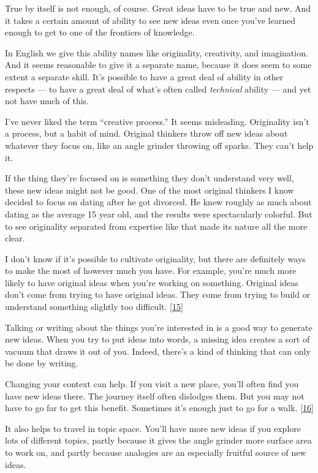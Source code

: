 True by itself is not enough, of course. Great ideas have to be true and
new. And it takes a certain amount of ability to see new ideas even once
you've learned enough to get to one of the frontiers of knowledge.

In English we give this ability names like originality, creativity, and
imagination. And it seems reasonable to give it a separate name, because
it does seem to some extent a separate skill. It's possible to have a
great deal of ability in other respects --- to have a great deal of
what's often called \emph{technical} ability --- and yet not have much
of this.

I've never liked the term ``creative process.'' It seems misleading.
Originality isn't a process, but a habit of mind. Original thinkers
throw off new ideas about whatever they focus on, like an angle grinder
throwing off sparks. They can't help it.

If the thing they're focused on is something they don't understand very
well, these new ideas might not be good. One of the most original
thinkers I know decided to focus on dating after he got divorced. He
knew roughly as much about dating as the average 15 year old, and the
results were spectacularly colorful. But to see originality separated
from expertise like that made its nature all the more clear.

I don't know if it's possible to cultivate originality, but there are
definitely ways to make the most of however much you have. For example,
you're much more likely to have original ideas when you're working on
something. Original ideas don't come from trying to have original ideas.
They come from trying to build or understand something slightly too
difficult. {[}\hyperref[f15n]{15}{]}

Talking or writing about the things you're interested in is a good way
to generate new ideas. When you try to put ideas into words, a missing
idea creates a sort of vacuum that draws it out of you. Indeed, there's
a kind of thinking that can only be done by writing.

Changing your context can help. If you visit a new place, you'll often
find you have new ideas there. The journey itself often dislodges them.
But you may not have to go far to get this benefit. Sometimes it's
enough just to go for a walk. {[}\hyperref[f16n]{16}{]}

It also helps to travel in topic space. You'll have more new ideas if
you explore lots of different topics, partly because it gives the angle
grinder more surface area to work on, and partly because analogies are
an especially fruitful source of new ideas.

